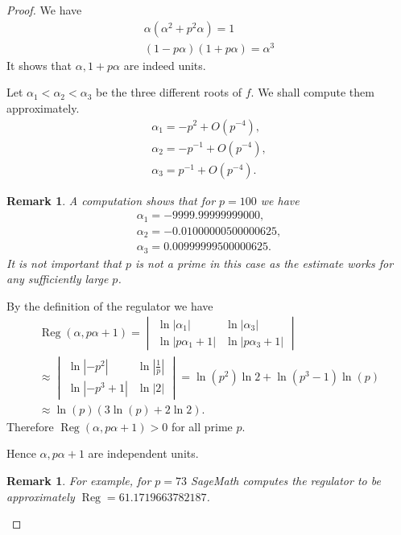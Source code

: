 \documentclass[a4paper]{article}
\newtheorem{Rem}[Thm]{Remark}
\DeclareMathOperator{\Reg}{Reg}        %
\begin{document}
\begin{proof}
We have
\begin{gather}
\alpha (\alpha ^2 + p^2 \alpha) = 1
\\
(1 - p \alpha)(1 + p \alpha) = \alpha^3
\end{gather}
It shows that $\alpha, 1 + p \alpha$ are indeed units.

Let $\alpha_1 < \alpha_2 < \alpha_3 $ be the three different roots of $f$.
We shall compute them approximately.
\begin{gather*}
\alpha_1 = -p^2 + O\left(p^{-4} \right), \\
\alpha_2 = - p^{-1}   + O\left(p^{-4} \right), \\
\alpha_3 = p^{-1} + O\left(p^{-4} \right)
.\end{gather*}

\begin{Rem}
A computation shows that for $p = 100$ we have
\begin{gather*}
\alpha_1 = -9999.99999999000 , \\
\alpha_2 = -0.01000000500000625, \\
\alpha_3 = 0.00999999500000625
.\end{gather*}
It is not important that $p$ is not a prime in this case as the estimate works for any sufficiently large $p$.
\end{Rem}

By the definition of the regulator we have
\begin{multline}
\Reg(\alpha, p\alpha + 1) = 
\begin{vmatrix}
\ln |\alpha_1| 		& \ln |\alpha_3| \\
\ln |p \alpha_1 + 1| 	& \ln |p \alpha_3 + 1|
\end{vmatrix} 
\\
\approx
\begin{vmatrix}
\ln |-p^2| 	& \ln |\frac{1}{p}| \\
\ln |-p^3 + 1| 	& \ln |2|
\end{vmatrix}
=
\ln(p^2)
\ln 2
+
\ln(p^3 - 1) \ln(p)
\\
\approx \ln(p) ( 3 \ln(p) + 2 \ln 2 )
.\end{multline}
Therefore $ \Reg(\alpha, p\alpha + 1) > 0 $ for all prime $p$.

Hence $\alpha, p\alpha + 1$ are independent units. 

\begin{Rem}
For example, for $p = 73$ SageMath computes the regulator to be approximately $\Reg = 61.1719663782187$.


\end{Rem}
\end{proof}
\end{document}
